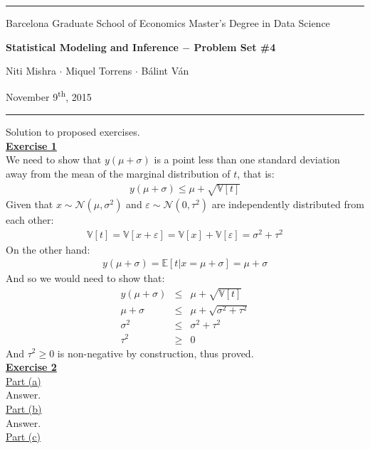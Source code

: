 \documentclass[a4paper, 11pt]{article}
\newcommand{\header}[4]{
	\begin{center}
		\rule{\linewidth}{0.5pt}
		
		{\small{#1}}
      
        \vspace{0.2in}
        
		{\large{#2}}
		
        \vspace{0.2in}
        
		{\small{#3}}
		
		\vspace{0.15in}
		
		{#4}
		
		\vspace{-0.1in}
		\rule{\linewidth}{0.6pt}
	\end{center}
}
\begin{document}
 
\header{\sc Barcelona Graduate School of Economics \hfill Master's Degree in Data Science}{\bf Statistical Modeling and Inference $-$ Problem Set \#4}{\sc Niti Mishra $\cdot$ Miquel Torrens $\cdot$ B\'alint V\'an}{November 9\textsuperscript{th}, 2015}
Solution to proposed exercises.\\
\newline \textbf{\underline{Exercise 1}}\\
\newline We need to show that $y(\mu + \sigma)$ is a point less than one standard deviation away from the mean of the marginal distribution of $t$, that is:
\begin{eqnarray}
y(\mu + \sigma) \leq \mu + \sqrt{\mathbb{V}[t]} \nonumber
\end{eqnarray}
Given that $x \sim \mathcal{N}(\mu, \sigma^2)$ and $\varepsilon \sim \mathcal{N}(0, \tau^2)$ are independently distributed from each other:
\begin{eqnarray}
\mathbb{V}[t] = \mathbb{V}[x + \varepsilon] = \mathbb{V}[x] + \mathbb{V}[\varepsilon] = \sigma^2 + \tau^2 \nonumber
\end{eqnarray}
On the other hand:
\begin{eqnarray}
y(\mu + \sigma) = \mathbb{E}[t | x = \mu + \sigma] = \mu + \sigma \nonumber
\end{eqnarray}
And so we would need to show that:
\begin{eqnarray}
y(\mu + \sigma) &\leq& \mu + \sqrt{\mathbb{V}[t]} \nonumber \\
\mu + \sigma &\leq& \mu + \sqrt{\sigma^2 + \tau^2} \nonumber \\
\sigma^2 &\leq& \sigma^2 + \tau^2  \nonumber \\
\tau^2 &\geq& 0 \nonumber
\end{eqnarray}
And $\tau^2 \geq 0$ is non-negative by construction, thus proved.\\
\newpage
\textbf{\underline{Exercise 2}}\\
\newline \underline{Part (a)}\\
\newline Answer.\\
\newline \underline{Part (b)}\\
\newline Answer.\\
\newline \underline{Part (c)}\\
\end{document}
